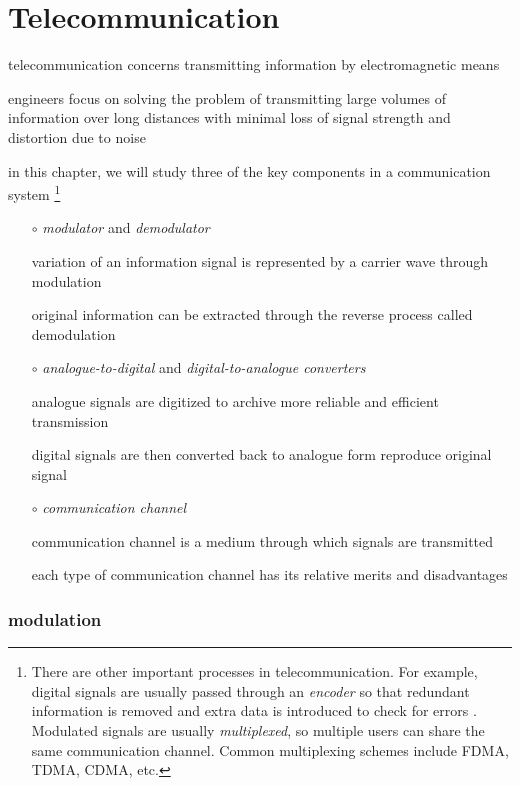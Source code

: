 \chapter{Telecommunication}


telecommunication concerns transmitting information by electromagnetic means

engineers focus on solving the problem of transmitting large volumes of information over long distances with minimal loss of signal strength and distortion due to noise

in this chapter, we will study three of the key components in a communication system
\footnote{There are other important processes in telecommunication. For example, digital signals are usually passed through an \emph{encoder} so that redundant information is removed and extra data is introduced to check for errors . Modulated signals are usually \emph{multiplexed}, so multiple users can share the same communication channel. Common multiplexing schemes include FDMA, TDMA, CDMA, etc.}

\begin{itemize}[leftmargin=\parindent]
	\item[$\circ$] \emph{modulator} and \emph{demodulator}
	
	variation of an information signal is represented by a carrier wave through modulation
	
	original information can be extracted through the reverse process called demodulation
	
	\item[$\circ$] \emph{analogue-to-digital} and \emph{digital-to-analogue converters}
	
	analogue signals are digitized to archive more reliable and efficient transmission
	
	digital signals are then converted back to analogue form reproduce original signal
	
	\item[$\circ$] \emph{communication channel}
	
	communication channel is a medium through which signals are transmitted
	
	each type of communication channel has its relative merits and disadvantages
\end{itemize}



\subsection{modulation}

